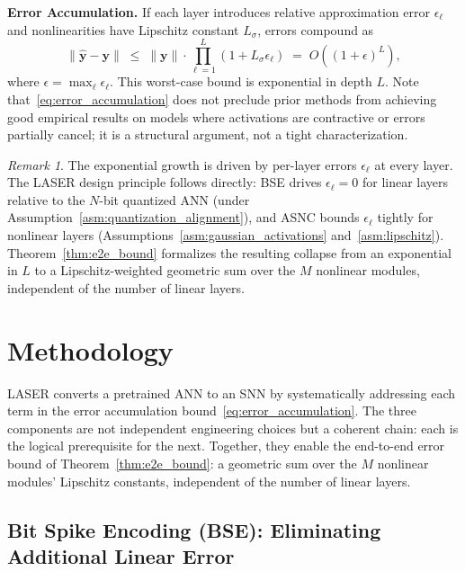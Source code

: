 \documentclass{article}
\theoremstyle{plain}
\theoremstyle{definition}
\theoremstyle{remark}
\newtheorem{remark}[theorem]{Remark}
\begin{document}
\noindent\textbf{Error Accumulation.}
If each layer introduces relative approximation error $\epsilon_\ell$ and nonlinearities have Lipschitz constant $L_\sigma$, errors compound as
\begin{equation}
\label{eq:error_accumulation}
\bigl\|\hat{\mathbf{y}} - \mathbf{y}\bigr\|
\;\le\; \|\mathbf{y}\| \cdot \prod_{\ell=1}^{L}(1 + L_\sigma \epsilon_\ell)
\;=\; O\!\left((1 + \epsilon)^L\right),
\end{equation}
where $\epsilon = \max_\ell \epsilon_\ell$. This worst-case bound is exponential in depth $L$. Note that~\eqref{eq:error_accumulation} does not preclude prior methods from achieving good empirical results on models where activations are contractive or errors partially cancel; it is a structural argument, not a tight characterization.

\begin{remark}
\label{rem:error_structure}
The exponential growth is driven by per-layer errors $\epsilon_\ell$ at every layer. The LASER design principle follows directly: BSE drives $\epsilon_\ell = 0$ for linear layers relative to the $N$-bit quantized ANN (under Assumption~\ref{asm:quantization_alignment}), and ASNC bounds $\epsilon_\ell$ tightly for nonlinear layers (Assumptions~\ref{asm:gaussian_activations} and~\ref{asm:lipschitz}). Theorem~\ref{thm:e2e_bound} formalizes the resulting collapse from an exponential in $L$ to a Lipschitz-weighted geometric sum over the $M$ nonlinear modules, independent of the number of linear layers.
\end{remark}


\section{Methodology}
\label{sec:methodology}

LASER converts a pretrained ANN to an SNN by systematically addressing each term in
the error accumulation bound~\eqref{eq:error_accumulation}. The three components
are not independent engineering choices but a coherent chain: each is the logical
prerequisite for the next. Together, they enable the end-to-end error bound of
Theorem~\ref{thm:e2e_bound}: a geometric sum over the $M$ nonlinear modules'
Lipschitz constants, independent of the number of linear layers.

\subsection{Bit Spike Encoding (BSE): Eliminating Additional Linear Error}
\label{subsec:bse}
\end{document}
